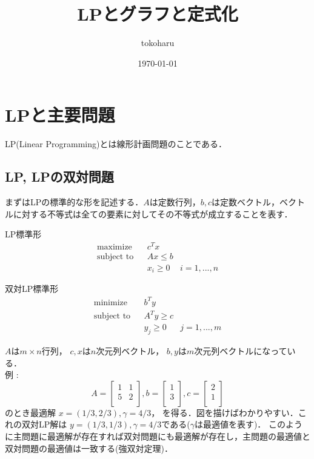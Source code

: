 \documentclass[13pt, a4paper, landscape]{jarticle}
\title{LPとグラフと定式化}
\author{tokoharu}
\date {\today}
\theoremstyle{nonitalic} %
\begin{document}
\maketitle

\section{LPと主要問題}
LP(Linear Programming)とは線形計画問題のことである．
\subsection {LP, LPの双対問題}
まずはLPの標準的な形を記述する．$A$は定数行列，$b, c$は定数ベクトル，ベクトルに対する不等式は全ての要素に対してその不等式が成立することを表す．

LP標準形
\begin{align}
 &&&&&\textrm{maximize}   && c^Tx \\
 &&&&&\textrm{subject to} && Ax \leq b  &&&&&\\
 &&&&&                    && x_i \geq 0 & i = 1,...,n &&&&&
\end{align}

双対LP標準形
\begin{align}
 &&&&&\textrm{minimize}   && b^Ty \\
 &&&&&\textrm{subject to} && A^T y \geq c  &&&&&\\
 &&&&&                    && y_j \geq 0 & j = 1,...,m &&&&&
\end{align}

 
$A$は$m\times n$行列， 
$c,x$は$n$次元列ベクトル， 
$b,y$は$m$次元列ベクトルになっている． \\

例 : 
\begin{equation*}
 A = 
 \left[\begin{array}{cc}
  1 & 1 \\
  5 & 2 \\
 \end{array}\right],
 b = 
 \left[\begin{array}{c}
     1 \\
     3 \\
   \end{array}\right],
 c = 
 \left[\begin{array}{c}
     2 \\
     1 \\
 \end{array}\right]
\end{equation*}
のとき最適解 $x = (1/3, 2/3) , \gamma = 4/3  $， を得る．図を描けばわかりやすい．これの双対LP解は
$y = (1/3, 1/3), \gamma = 4/3$である($\gamma$は最適値を表す)．
このように主問題に最適解が存在すれば双対問題にも最適解が存在し，主問題の最適値と双対問題の最適値は一致する(強双対定理)．
\end{document}
